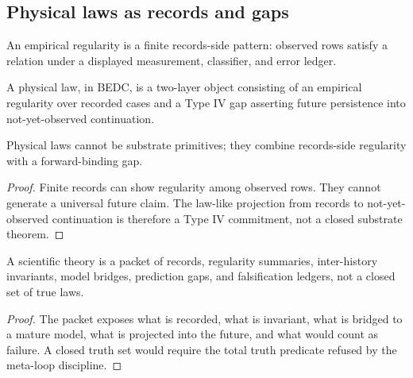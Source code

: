 \subsection{Physical laws as records and gaps}
\label{subsec:philosophy-physical-laws-records-gaps}

\begin{definition}
\label{def:philosophy-empirical-regularity}
An empirical regularity is a finite records-side pattern: observed rows
satisfy a relation under a displayed measurement, classifier, and error
ledger.
\end{definition}

\begin{definition}
\label{def:philosophy-physical-law}
A physical law, in BEDC, is a two-layer object consisting of an
empirical regularity over recorded cases and a Type IV gap asserting
future persistence into not-yet-observed continuation.
\end{definition}

\begin{theorem}
\label{thm:philosophy-physical-laws-not-primitives}
Physical laws cannot be substrate primitives; they combine records-side
regularity with a forward-binding gap.
\end{theorem}
\begin{proof}
Finite records can show regularity among observed rows. They cannot
generate a universal future claim. The law-like projection from records
to not-yet-observed continuation is therefore a Type IV commitment, not
a closed substrate theorem.
\end{proof}

\begin{corollary}
\label{cor:philosophy-scientific-theories-not-truth-sets}
A scientific theory is a packet of records, regularity summaries,
inter-history invariants, model bridges, prediction gaps, and
falsification ledgers, not a closed set of true laws.
\end{corollary}
\begin{proof}
The packet exposes what is recorded, what is invariant, what is bridged
to a mature model, what is projected into the future, and what would
count as failure. A closed truth set would require the total truth
predicate refused by the meta-loop discipline.
\end{proof}


